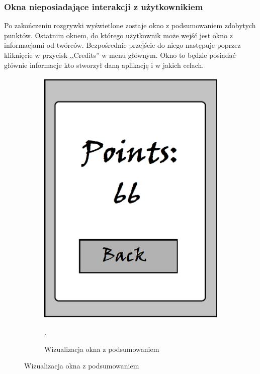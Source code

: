 \documentclass[15pt]{article}
\begin{document}
\subsubsection{Okna nieposiadające interakcji z użytkownikiem}
Po zakończeniu rozgrywki wyświetlone zostaje okno z podsumowaniem zdobytych punktów.
Ostatnim oknem, do którego użytkownik może wejść jest okno z informacjami od twórców. Bezpośrednie przejście do niego następuje poprzez kliknięcie w przycisk ,,Credits'' w menu głównym. Okno to będzie posiadać głównie informacje kto stworzył daną aplikację i w jakich celach.
\newline
\begin{figure}[h!]
  \centering
  \begin{subfigure}[b]{0.35\linewidth}
    \includegraphics[width=\linewidth]{points.png}
    \caption{Wizualizacja okna z podsumowaniem}.
  \end{subfigure}

\end{figure}
\end{document}
